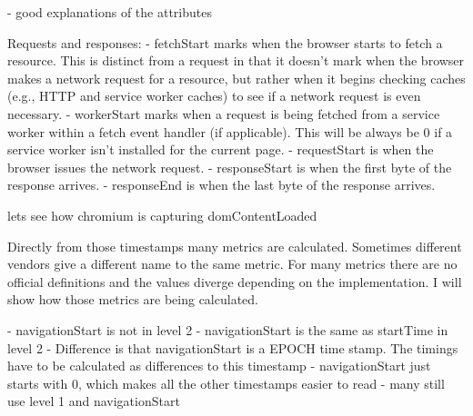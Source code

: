 - good explanations of the attributes



Requests and responses:
- fetchStart marks when the browser starts to fetch a resource. This is distinct from a request in that it doesn't mark when the browser makes a network request for a resource, but rather when it begins checking caches (e.g., HTTP and service worker caches) to see if a network request is even necessary.
- workerStart marks when a request is being fetched from a service worker within a fetch event handler (if applicable). This will be always be 0 if a service worker isn't installed for the current page.
- requestStart is when the browser issues the network request.
- responseStart is when the first byte of the response arrives.
- responseEnd is when the last byte of the response arrives.







lets see how chromium is capturing domContentLoaded





Directly from those timestamps many metrics are calculated.
Sometimes different vendors give a different name to the same metric.
For many metrics there are no official definitions and the values diverge depending on the implementation.
I will show how those metrics are being calculated.



- navigationStart is not in level 2
- navigationStart is the same as startTime in level 2
- Difference is that navigationStart is a EPOCH time stamp. The timings have to be calculated as differences to this timestamp
- navigationStart just starts with 0, which makes all the other timestamps easier to read
- many still use level 1 and navigationStart




